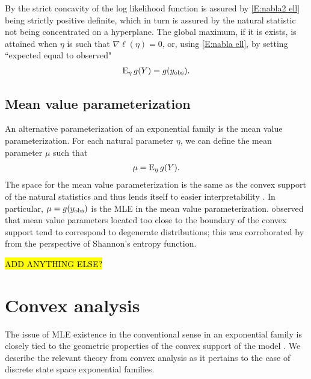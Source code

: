 By the strict concavity of the log likelihood function is assured by \eqref{E:nabla2 
ell} being strictly positive definite, which in turn is assured by the natural statistic
not being concentrated on a hyperplane.  The global 
maximum, if it is exists, is attained when $\eta$ is such that $\nabla \ell( \eta ) = 
0$, or, using \eqref{E:nabla ell}, by setting ``expected equal to observed"
\begin{align}
	\operatorname{E}_\eta g(Y) = g(y_{\text{obs}}). \label{E:Observed-Expected}
\end{align}



\subsection{Mean value parameterization}

An alternative parameterization of an exponential family is the mean value 
parameterization.  For each natural parameter $\eta$, we can define the mean parameter 
$\mu$ such that
\begin{align*}
	\mu = \operatorname{E}_\eta g(Y).
\end{align*}
The space for the mean value parameterization is the same as the convex support of the 
natural statistics and thus lends itself to easier interpretability  \citep
{Handcock:degeneracy, Rinaldo:2009}.  In particular, $\mu = g(y_{\text{obs}})$ is the MLE in 
the mean value parameterization.  \citeauthor{Handcock:degeneracy} observed that mean 
value parameters located too close to the boundary of the convex support tend to 
correspond to degenerate distributions; this was corroborated by 
\citeauthor{Rinaldo:2009} from the perspective of Shannon's entropy function.

\hl{ADD ANYTHING ELSE?}



\section{Convex analysis} \label{S:Convex analysis}
The issue of MLE existence in the conventional sense in an exponential family is 
closely tied to the geometric properties of 
the convex support of the model \citep{Barndorff, Geyer:gdor, Rinaldo:2009}.  We 
describe the relevant theory from convex analysis as it pertains to the case of 
discrete state space exponential families.

